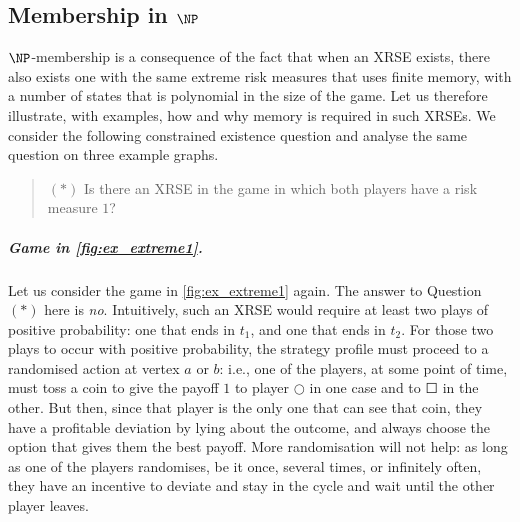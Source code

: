 \subsection{Membership in $\NP$}
$\NP$-membership is a consequence of the fact that when an XRSE exists, there also exists one with the same extreme risk measures that uses finite memory, with a number of states that is polynomial in the size of the game.
Let us therefore illustrate, with examples, how and why memory is required in such XRSEs.
We consider the following constrained existence question and analyse the same question on three example graphs. 
\begin{quote}$(*)$
   Is there an XRSE in the game in which both players have a risk measure $1$?
\end{quote}

\subparagraph*{Game in \cref{fig:ex_extreme1}.}Let us consider the game in \cref{fig:ex_extreme1} again.
The answer to Question~$(*)$ here is \emph{no}.
Intuitively, such an XRSE would require at least two plays of positive probability: one that ends in $t_1$, and one that ends in $t_2$.
For those two plays to occur with positive probability, the strategy profile must proceed to a randomised action at vertex $a$ or $b$: i.e., one of the players, at some point of time, must toss a coin to give the payoff $1$ to player $\Circle$ in one case and to $\Square$ in the other.
But then, since that player is the only one that can see that coin, they have a profitable deviation by lying about the outcome, and always choose the option that gives them the best payoff.
More randomisation will not help: as long as one of the players randomises, be it once, several times, or infinitely often, they have an incentive to deviate and stay in the cycle and wait until the other player leaves.

